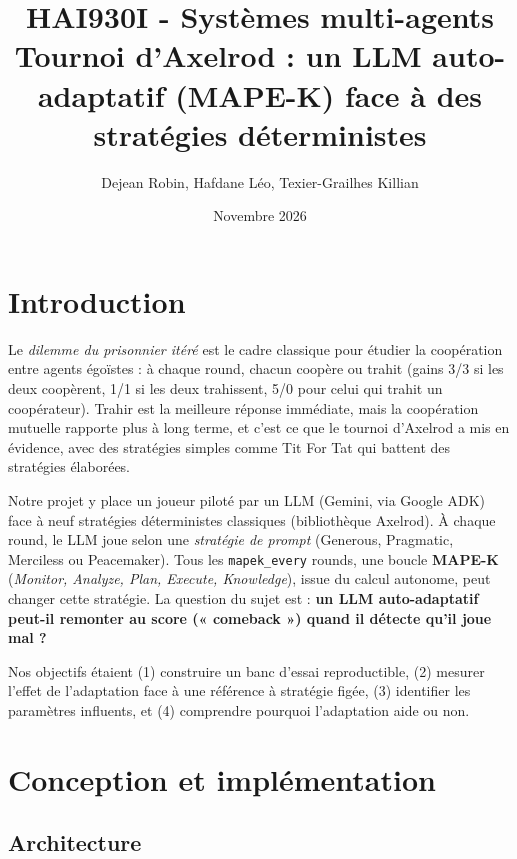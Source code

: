 \documentclass[10pt,a4paper]{article}
\title{HAI930I - Systèmes multi-agents\\Tournoi d'Axelrod : un LLM auto-adaptatif (MAPE-K) face à des stratégies déterministes}
\author{Dejean Robin, Hafdane Léo, Texier-Grailhes Killian}
\date{Novembre 2026}
\begin{document}
\maketitle
\vspace{-1.5em}

\section{Introduction}

Le \emph{dilemme du prisonnier itéré} est le cadre classique pour étudier la
coopération entre agents égoïstes : à chaque round, chacun coopère ou trahit
(gains 3/3 si les deux coopèrent, 1/1 si les deux trahissent, 5/0 pour celui qui
trahit un coopérateur). Trahir est la meilleure réponse immédiate, mais la
coopération mutuelle rapporte plus à long terme, et c'est ce que le tournoi
d'Axelrod a mis en évidence, avec des stratégies simples comme Tit For Tat qui
battent des stratégies élaborées.

Notre projet y place un joueur piloté par un LLM (Gemini, via Google ADK) face à
neuf stratégies déterministes classiques (bibliothèque Axelrod). À chaque round, le LLM joue selon une \emph{stratégie
  de prompt} (Generous, Pragmatic, Merciless ou Peacemaker). Tous les
\texttt{mapek\_every} rounds, une boucle \textbf{MAPE-K} (\emph{Monitor,
  Analyze, Plan, Execute, Knowledge}), issue du calcul autonome, peut changer
cette stratégie. La question du sujet est : \textbf{un LLM auto-adaptatif
  peut-il remonter au score (« comeback ») quand il détecte qu'il joue mal ?}

Nos objectifs étaient (1) construire un banc d'essai reproductible, (2) mesurer
l'effet de l'adaptation face à une référence à stratégie figée, (3) identifier
les paramètres influents, et (4) comprendre pourquoi l'adaptation aide ou non.

\section{Conception et implémentation}

\subsection{Architecture}
\end{document}
